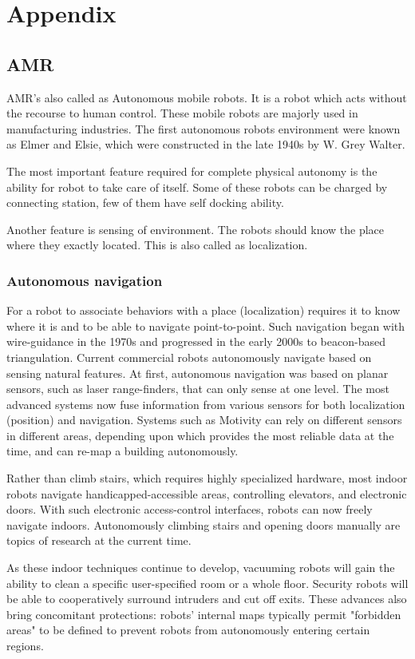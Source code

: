 \chapter{Appendix}
\section{AMR}

AMR's also called as Autonomous mobile robots. It is a robot which acts without the recourse to human control. These mobile robots are majorly used in manufacturing industries. The first autonomous robots environment were known as Elmer and Elsie, which were constructed in the late 1940s by W. Grey Walter. 

The most important feature required for complete physical autonomy is the ability for robot to take care of itself. Some of these robots can be charged by connecting station, few of them have self docking ability. 

Another feature is sensing of environment. The robots should know the place where they exactly located. This is also called as localization. 

\subsection{Autonomous navigation}

For a robot to associate behaviors with a place (localization) requires it to know where it is and to be able to navigate point-to-point.  Such navigation began with wire-guidance in the 1970s and progressed in the early 2000s to beacon-based triangulation. Current commercial robots autonomously navigate based on sensing natural features. At first, autonomous navigation was based on planar sensors, such as laser range-finders, that can only sense at one level. The most advanced systems now fuse information from various sensors for both localization (position) and navigation. Systems such as Motivity can rely on different sensors in different areas, depending upon which provides the most reliable data at the time, and can re-map a building autonomously.

Rather than climb stairs, which requires highly specialized hardware, most indoor robots navigate handicapped-accessible areas, controlling elevators, and electronic doors. With such electronic access-control interfaces, robots can now freely navigate indoors. Autonomously climbing stairs and opening doors manually are topics of research at the current time.

As these indoor techniques continue to develop, vacuuming robots will gain the ability to clean a specific user-specified room or a whole floor. Security robots will be able to cooperatively surround intruders and cut off exits. These advances also bring concomitant protections: robots' internal maps typically permit "forbidden areas" to be defined to prevent robots from autonomously entering certain regions.